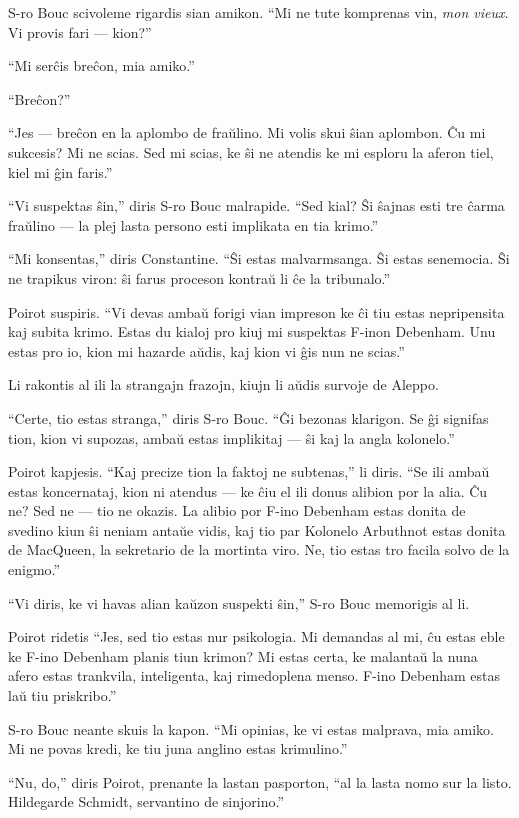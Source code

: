 S-ro Bouc scivoleme rigardis sian amikon. ``Mi ne tute komprenas vin, \emph{mon vieux}. Vi provis fari --- kion?''

``Mi serĉis breĉon, mia amiko.''

``Breĉon?''

``Jes --- breĉon en la aplombo de fraŭlino. Mi volis skui ŝian aplombon. Ĉu mi sukcesis? Mi ne scias. Sed mi scias, ke ŝi ne atendis ke mi esploru la aferon tiel, kiel mi ĝin faris.''

``Vi suspektas ŝin,'' diris S-ro Bouc malrapide. ``Sed kial? Ŝi ŝajnas esti tre ĉarma fraŭlino --- la plej lasta persono esti implikata en tia krimo.''

``Mi konsentas,'' diris Constantine. ``Ŝi estas malvarmsanga. Ŝi estas senemocia. Ŝi ne trapikus viron: ŝi farus proceson kontraŭ li ĉe la tribunalo.''

Poirot suspiris. ``Vi devas ambaŭ forigi vian impreson ke ĉi tiu estas nepripensita kaj subita krimo. Estas du kialoj pro kiuj mi suspektas F-inon Debenham. Unu estas pro io, kion mi hazarde aŭdis, kaj kion vi ĝis nun ne scias.''

Li rakontis al ili la strangajn frazojn, kiujn li aŭdis survoje de Aleppo.

``Certe, tio estas stranga,'' diris S-ro Bouc. ``Ĝi bezonas klarigon. Se ĝi signifas tion, kion vi supozas, ambaŭ estas implikitaj --- ŝi kaj la angla kolonelo.''

Poirot kapjesis. ``Kaj precize tion la faktoj ne subtenas,'' li diris. ``Se ili ambaŭ estas koncernataj, kion ni atendus --- ke ĉiu el ili donus alibion por la alia. Ĉu ne? Sed ne --- tio ne okazis. La alibio por F-ino Debenham estas donita de svedino kiun ŝi neniam antaŭe vidis, kaj tio par Kolonelo Arbuthnot estas donita de MacQueen, la sekretario de la mortinta viro. Ne, tio estas tro facila solvo de la enigmo.''

``Vi diris, ke vi havas alian kaŭzon suspekti ŝin,'' S-ro Bouc memorigis al li.

Poirot ridetis ``Jes, sed tio estas nur psikologia. Mi demandas al mi, ĉu estas eble ke F-ino Debenham planis tiun krimon? Mi estas certa, ke malantaŭ la nuna afero estas trankvila, inteligenta, kaj rimedoplena menso. F-ino Debenham estas laŭ tiu priskribo.''

S-ro Bouc neante skuis la kapon. ``Mi opinias, ke vi estas malprava, mia amiko. Mi ne povas kredi, ke tiu juna anglino estas krimulino.''

``Nu, do,'' diris Poirot, prenante la lastan pasporton, ``al la lasta nomo sur la listo. Hildegarde Schmidt, servantino de sinjorino.''

